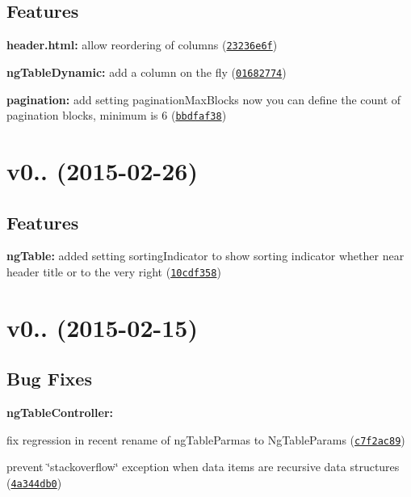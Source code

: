 \subsection*{Features}


\begin{DoxyItemize}
\item {\bfseries header.\+html\+:} allow reordering of columns (\href{https://github.com/esvit/ng-table/commit/23236e6f6b78e18aab29e4926110d7ad5f26432b}{\tt 23236e6f})
\item {\bfseries ng\+Table\+Dynamic\+:} add a column on the fly (\href{https://github.com/esvit/ng-table/commit/016827745bd618aeafc16f4deaa855b29452626a}{\tt 01682774})
\item {\bfseries pagination\+:} add setting pagination\+Max\+Blocks now you can define the count of pagination blocks, minimum is 6 (\href{https://github.com/esvit/ng-table/commit/bbdfaf387dd8e47719be54edf1e4d2b43350d274}{\tt bbdfaf38})
\end{DoxyItemize}

\label{_v0.5.4}%
 \section*{v0.. (2015-\/02-\/26)}

\subsection*{Features}


\begin{DoxyItemize}
\item {\bfseries ng\+Table\+:} added setting sorting\+Indicator to show sorting indicator whether near header title or to the very right (\href{https://github.com/esvit/ng-table/commit/10cdf358cfcab2843fcade5de4d512f3b3ab9577}{\tt 10cdf358})
\end{DoxyItemize}

\label{_v0.5.0}%
 \section*{v0.. (2015-\/02-\/15)}

\subsection*{Bug Fixes}


\begin{DoxyItemize}
\item {\bfseries ng\+Table\+Controller\+:}
\begin{DoxyItemize}
\item fix regression in recent rename of ng\+Table\+Parmas to Ng\+Table\+Params (\href{https://github.com/esvit/ng-table/commit/c7f2ac896b78eaad67a6095c057807217bf1e318}{\tt c7f2ac89})
\item prevent \char`\"{}stackoverflow\char`\"{} exception when data items are recursive data structures (\href{https://github.com/esvit/ng-table/commit/4a344db05954502e6679d33f6d8946952dddee10}{\tt 4a344db0})
\end{DoxyItemize}
\end{DoxyItemize}


